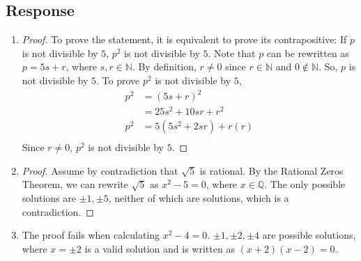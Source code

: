 \documentclass[13pt]{article}
\begin{document}
\subsection*{Response}
\begin{enumerate}[label=(\alph*)]
\item
  \begin{proof}
    To prove the statement, it is equivalent to prove its contrapositive: If $p$ is not divisible by $5$,
    $p^2$ is not divisible by $5$. Note that $p$ can be rewritten as $p = 5s + r$, where $s, r \in \mathbb{N}$.
    By definition, $r \neq 0$ since $r \in \mathbb{N}$ and $0 \not\in \mathbb{N}$. So, $p$ is not divisible by $5$.
    To prove $p^2$ is not divisible by $5$,
    \begin{align*}
      p^2 &= (5s + r)^2 \\
          &= 25s^2 + 10sr + r^2 \\
      p^2 &= 5(5s^2 + 2sr) + r(r) \\
    \end{align*}
    Since $r \neq 0$, $p^2$ is not divisible by $5$.
  \end{proof}
\item
  \begin{proof}
    Assume by contradiction that $\sqrt{5}$ is rational. By the Rational Zeros Theorem, we can rewrite $\sqrt{5}$
    as $x^2 - 5 = 0$, where $x \in \mathbb{Q}$. The only possible solutions are $\pm 1, \pm 5$, neither of which
    are solutions, which is a contradiction.
  \end{proof}
\item The proof fails when calculating $x^2 - 4 = 0$. $\pm 1, \pm 2, \pm 4$ are possible solutions, where $x = \pm 2$
  is a valid solution and is written as $(x + 2)(x - 2) = 0$.
\end{enumerate}
\end{document}

